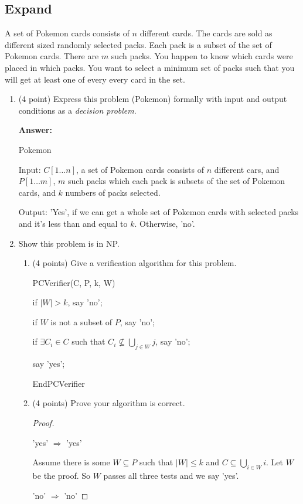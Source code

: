 \documentclass[paper=a4, fontsize=11pt]{scrartcl}
\newcommand\tab[1][0.6cm]{\hspace*{#1}}
\numberwithin{equation}{section}		%
\numberwithin{figure}{section}			%
\numberwithin{table}{section}				%
\begin{document}
\subsection{Expand}
A set of Pokemon cards consists of $n$ different cards.  The cards are sold as different sized randomly selected packs.  Each pack is a subset of the set of Pokemon cards.  There are $m$ such packs.  You happen to know which cards were placed in which packs.  You want to select a minimum set of packs such that you will get at least one of every every card in the set.
\begin{enumerate}
\item (4 point) Express this problem (Pokemon) formally with input and output conditions as a \textit{decision problem}.

\textbf{Answer:}

Pokemon

Input: $C[1\dots n]$, a set of Pokemon cards consists of $n$ different cars, and $P[1\dots m]$, $m$ such packs which each pack is subsets of the set of Pokemon cards, and $k$ numbers of packs selected.

Output: 'Yes', if we can get a whole set of Pokemon cards with selected packs and it's less than and equal to $k$. Otherwise, 'no'.

\item Show this problem is in NP.
\begin{enumerate}
\item (4 points) Give a verification algorithm for this problem. 

PCVerifier(C, P, k, W)

\tab if $|W| > k$, say 'no';

\tab if $W$ is not a subset of $P$, say 'no';

\tab if $\exists C_i \in C$ such that $C_i \not\subseteq \bigcup_{j \in W} j$, say 'no';

\tab say 'yes';

EndPCVerifier


\item (4 points) Prove your algorithm is correct.
\begin{proof}
	
	\
	
	'yes' $\Rightarrow$ 'yes'
	
	Assume there is some $W \subseteq P$ such that $|W| \leq k$ and $C \subseteq \bigcup_{i \in W} i$. Let $W$ be the proof. So $W$ passes all three tests and we say 'yes'.
	
	'no' $\Rightarrow$ 'no'
	

\end{proof}
\end{enumerate}
\end{enumerate}
\end{document}
